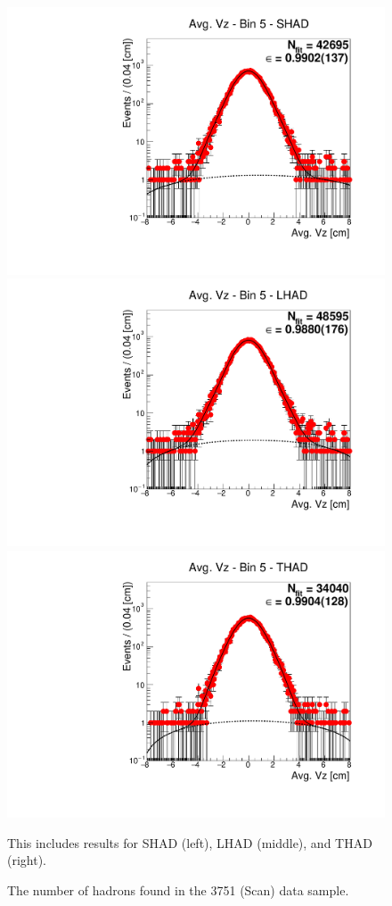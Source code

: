 \begin{figure}[H]
\centering
\includegraphics[scale=0.25]{figures/plots/nonDDbar_fit_results/scan/fit_scan_05_data_SHAD.pdf}
\hspace{-0.5cm}
\includegraphics[scale=0.25]{figures/plots/nonDDbar_fit_results/scan/fit_scan_05_data_LHAD.pdf}
\hspace{-0.5cm}
\includegraphics[scale=0.25]{figures/plots/nonDDbar_fit_results/scan/fit_scan_05_data_THAD.pdf}
\caption{The number of hadrons found in the 3751 (Scan) data sample.}
{This includes results for SHAD (left), LHAD (middle), and THAD (right).}
\label{fig:hadron_fits_scan_05}
\end{figure}


